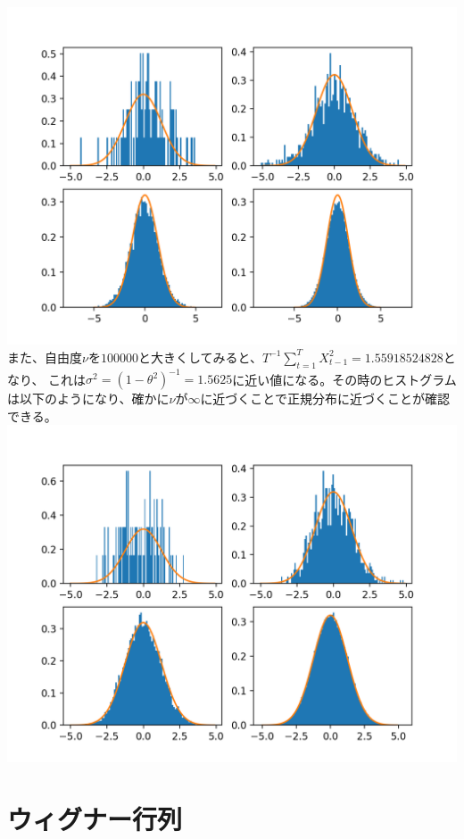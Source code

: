 \documentclass{jsarticle}
\begin{document}
\subsection{}
\includegraphics{3.png}
また、自由度$\nu$を$100000$と大きくしてみると、$T^{-1}\sum_{t=1}^{T} X_{t-1}^2 = 1.55918524828$となり、
これは$\sigma^2 = (1-\theta^2)^{-1} = 1.5625$に近い値になる。その時のヒストグラムは以下のようになり、確かに$\nu$が$\infty$に近づくことで正規分布に近づくことが確認できる。\\
\includegraphics{4.png}

\section{ウィグナー行列}
\end{document}

